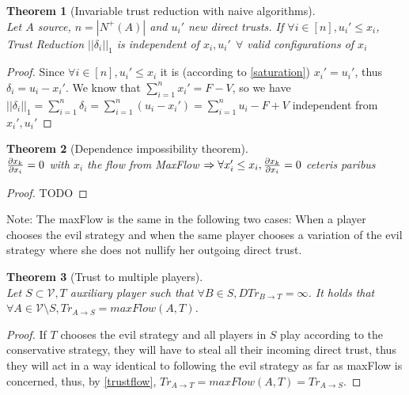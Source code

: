 \documentclass[11pt]{article}
\newtheorem{theorem}{Theorem}[section]
\theoremstyle{definition}
\theoremstyle{corollary}
\theoremstyle{lemma}
\begin{document}
    \begin{theorem}[Invariable trust reduction with naive algorithms] \ \\
    \label{invariability}
       Let $A$ source, $n = |N^{+}(A)|$ and $u_i'$ new direct trusts. If $\forall i \in [n],u_i' \leq x_i$,
       Trust Reduction $||\delta_i||_1$ is independent of $x_i, u_i' \:\: \forall$ valid configurations of $x_i$
    \end{theorem}
    \begin{proof} 
       Since $\forall i \in [n],u_i' \leq x_i$ it is (according to \ref{saturation}) $x_i' = u_i'$, thus
       $\delta_i = u_i - x_i'$. We know that $\sum\limits_{i=1}^{n}x_i' = F - V$, so we have $||\delta_i||_1 =
       \sum\limits_{i=1}^{n}\delta_i = \sum\limits_{i=1}^{n}(u_i - x_i') = \sum\limits_{i=1}^{n}u_i - F + V$ independent
       from $x_i', u_i'$
    \end{proof}

    \begin{theorem}[Dependence impossibility theorem] \ \\
    \label{independence}
       ${\partial x_k \over \partial x_i} = 0$ with $x_i$ the flow from MaxFlow $\Rightarrow
         \forall x_i' \leq x_i, {\partial x_k \over \partial x_i} = 0$ ceteris paribus
    \end{theorem}
    \begin{proof}
       TODO
    \end{proof}
    Note: The maxFlow is the same in the following two cases: When a player chooses the evil strategy and when the same
    player chooses a variation of the evil strategy where she does not nullify her outgoing direct trust.

    \begin{theorem}[Trust to multiple players] \ \\
    \label{trustmany}
       Let $S \subset \mathcal{V}, T$ auxiliary player such that $\forall B \in S, DTr_{B \rightarrow T} = \infty$.
       It holds that $\forall A \in \mathcal{V} \setminus S, Tr_{A \rightarrow S} = maxFlow(A, T)$.
    \end{theorem}       
    \begin{proof}
       If $T$ chooses the evil strategy and all players in $S$ play according to the conservative strategy, they will have to steal
       all their incoming direct trust, thus they will act in a way identical to following the evil strategy as far as
       maxFlow is concerned, thus, by \ref{trustflow}, $Tr_{A \rightarrow T} = maxFlow(A, T) = Tr_{A \rightarrow S}$.
    \end{proof}
\end{document}
